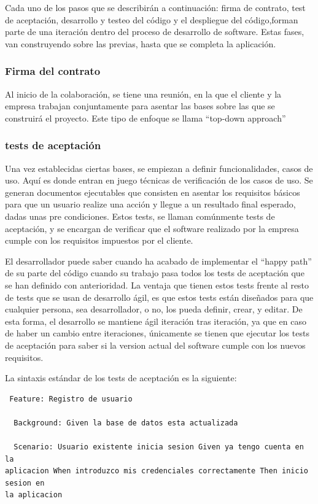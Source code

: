 \documentclass[12pt]{report} %
\begin{document}
Cada uno de los pasos que se describirán a continuación: firma de contrato, test
de aceptación, desarrollo y testeo del código y el despliegue del código,forman
parte de una iteración dentro del proceso de desarrollo de software.  Estas
fases, van construyendo sobre las previas, hasta que se completa la aplicación.

\subsubsection{Firma del contrato}

Al inicio de la colaboración, se tiene una reunión, en la que el cliente y la
empresa trabajan conjuntamente para asentar las bases sobre las que se
construirá el proyecto.  Este tipo de enfoque se llama ``top-down approach''

\subsubsection{tests de aceptación}

Una vez establecidas ciertas bases, se empiezan a definir funcionalidades, casos
de uso.  Aquí es donde entran en juego técnicas de verificación de los casos de
uso.  Se generan documentos ejecutables que consisten en asentar los requisitos
básicos para que un usuario realize una acción y llegue a un resultado final
esperado, dadas unas pre condiciones.  Estos tests, se llaman comúnmente tests
de aceptación, y se encargan de verificar que el software realizado por la
empresa cumple con los requisitos impuestos por el cliente.

El desarrollador puede saber cuando ha acabado de implementar el ``happy path''
de su parte del código cuando su trabajo pasa todos los tests de aceptación que
se han definido con anterioridad.  La ventaja que tienen estos tests frente al
resto de tests que se usan de desarrollo ágil, es que estos tests están
diseñados para que cualquier persona, sea desarrollador, o no, los pueda
definir, crear, y editar.  De esta forma, el desarrollo se mantiene ágil
iteración tras iteración, ya que en caso de haber un cambio entre iteraciones,
únicamente se tienen que ejecutar los tests de aceptación para saber si la
version actual del software cumple con los nuevos requisitos.

La sintaxis estándar de los tests de aceptación es la siguiente:

\begin{lstlisting} Feature: Registro de usuario

  Background: Given la base de datos esta actualizada

  Scenario: Usuario existente inicia sesion Given ya tengo cuenta en la
aplicacion When introduzco mis credenciales correctamente Then inicio sesion en
la aplicacion \end{lstlisting}
\end{document}
